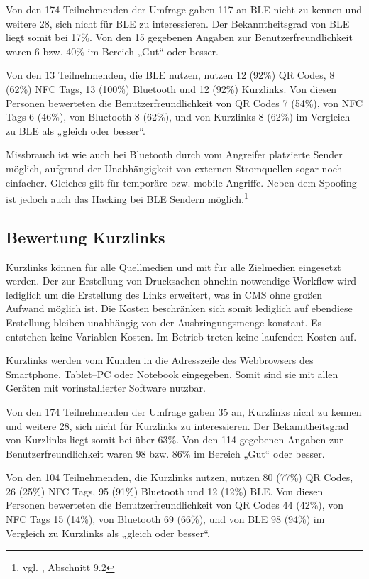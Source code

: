 Von den 174 Teilnehmenden der Umfrage gaben 117 an \ac{BLE} nicht zu kennen und weitere 28, sich nicht für \ac{BLE} zu interessieren. Der Bekanntheitsgrad von \ac{BLE} liegt somit bei 17\%. Von den 15 gegebenen Angaben zur Benutzerfreundlichkeit waren 6 bzw. 40\% im Bereich „Gut“ oder besser.

Von den 13 Teilnehmenden, die \ac{BLE} nutzen, nutzen 12 (92\%) QR Codes, 8 (62\%) NFC Tags, 13 (100\%) Bluetooth und 12 (92\%) Kurzlinks. Von diesen Personen bewerteten die  Benutzerfreundlichkeit von QR Codes 7 (54\%), von NFC Tags 6 (46\%), von Bluetooth 8 (62\%), und von Kurzlinks 8 (62\%) im Vergleich zu \ac{BLE} als „gleich oder besser“.

Missbrauch ist wie auch bei Bluetooth durch vom Angreifer platzierte Sender möglich, aufgrund der Unabhängigkeit von externen Stromquellen sogar noch einfacher. Gleiches gilt für temporäre bzw. mobile Angriffe. Neben dem Spoofing ist jedoch auch das Hacking bei BLE Sendern möglich.\footnote{vgl. \cite{gilchrist}, Abschnitt 9.2} 

\subsection{Bewertung Kurzlinks} %
\label{sub:bewertung_kurzlinks}
Kurzlinks können für alle Quellmedien und mit für alle Zielmedien eingesetzt werden. Der zur Erstellung von Drucksachen ohnehin notwendige Workflow wird lediglich um die Erstellung des Links erweitert, was in \ac{CMS} ohne großen Aufwand möglich ist. Die Kosten beschränken sich somit lediglich auf ebendiese Erstellung bleiben unabhängig von der Ausbringungsmenge konstant. Es entstehen keine Variablen Kosten. Im Betrieb treten keine laufenden Kosten auf.

Kurzlinks werden vom Kunden in die Adresszeile des Webbrowsers des Smartphone, Tablet–PC oder Notebook eingegeben. Somit sind sie mit allen Geräten mit vorinstallierter Software nutzbar. 

Von den 174 Teilnehmenden der Umfrage gaben 35 an, Kurzlinks nicht zu kennen und weitere 28, sich nicht für Kurzlinks zu interessieren. Der Bekanntheitsgrad von Kurzlinks liegt somit bei über 63\%. Von den 114 gegebenen Angaben zur Benutzerfreundlichkeit waren 98 bzw. 86\% im Bereich „Gut“ oder besser. 

Von den 104 Teilnehmenden, die Kurzlinks nutzen, nutzen 80 (77\%) QR Codes, 26 (25\%) NFC Tags, 95 (91\%) Bluetooth und 12 (12\%) \ac{BLE}. Von diesen Personen bewerteten die  Benutzerfreundlichkeit von QR Codes 44 (42\%), von NFC Tags 15 (14\%), von Bluetooth 69 (66\%), und von \ac{BLE} 98 (94\%) im Vergleich zu Kurzlinks als „gleich oder besser“.

